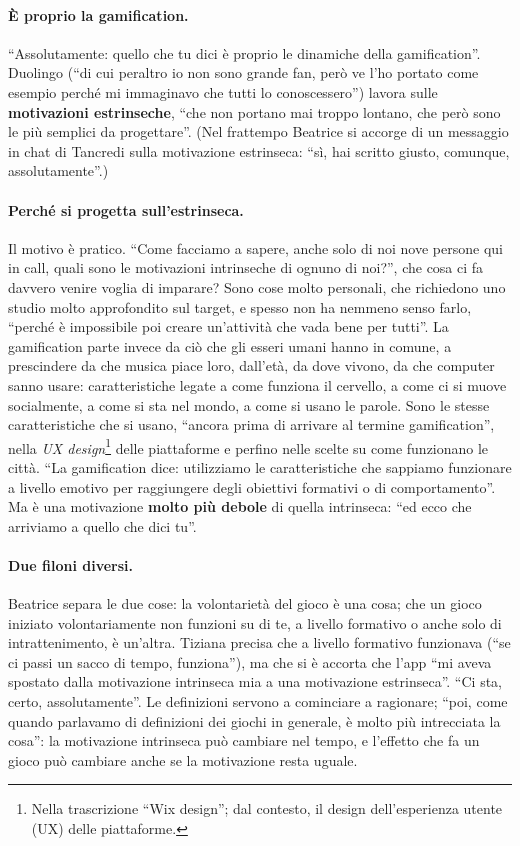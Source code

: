 \paragraph{È proprio la gamification.} ``Assolutamente: quello che tu dici è proprio
le dinamiche della gamification''. Duolingo (``di cui peraltro io non sono grande fan,
però ve l'ho portato come esempio perché mi immaginavo che tutti lo conoscessero'')
lavora sulle \textbf{motivazioni estrinseche}, ``che non portano mai troppo lontano,
che però sono le più semplici da progettare''. (Nel frattempo Beatrice si accorge di
un messaggio in chat di Tancredi sulla motivazione estrinseca: ``sì, hai scritto
giusto, comunque, assolutamente''.)

\paragraph{Perché si progetta sull'estrinseca.} Il motivo è pratico. ``Come facciamo
a sapere, anche solo di noi nove persone qui in call, quali sono le motivazioni
intrinseche di ognuno di noi?'', che cosa ci fa davvero venire voglia di imparare? Sono
cose molto personali, che richiedono uno studio molto approfondito sul target, e
spesso non ha nemmeno senso farlo, ``perché è impossibile poi creare un'attività che
vada bene per tutti''. La gamification parte invece da ciò che gli esseri umani hanno
in comune, a prescindere da che musica piace loro, dall'età, da dove vivono, da che
computer sanno usare: caratteristiche legate a come funziona il cervello, a come ci si
muove socialmente, a come si sta nel mondo, a come si usano le parole. Sono le stesse
caratteristiche che si usano, ``ancora prima di arrivare al termine gamification'',
nella \emph{UX design}\footnote{Nella trascrizione ``Wix design''; dal contesto, il
design dell'esperienza utente (UX) delle piattaforme.} delle piattaforme e perfino
nelle scelte su come funzionano le città. ``La gamification dice: utilizziamo le
caratteristiche che sappiamo funzionare a livello emotivo per raggiungere degli
obiettivi formativi o di comportamento''. Ma è una motivazione \textbf{molto più
debole} di quella intrinseca: ``ed ecco che arriviamo a quello che dici tu''.

\paragraph{Due filoni diversi.} Beatrice separa le due cose: la volontarietà del gioco
è una cosa; che un gioco iniziato volontariamente non funzioni su di te, a livello
formativo o anche solo di intrattenimento, è un'altra. Tiziana precisa che a livello
formativo funzionava (``se ci passi un sacco di tempo, funziona''), ma che si è
accorta che l'app ``mi aveva spostato dalla motivazione intrinseca mia a una
motivazione estrinseca''. ``Ci sta, certo, assolutamente''. Le definizioni servono a
cominciare a ragionare; ``poi, come quando parlavamo di definizioni dei giochi in
generale, è molto più intrecciata la cosa'': la motivazione intrinseca può cambiare
nel tempo, e l'effetto che fa un gioco può cambiare anche se la motivazione resta
uguale.

